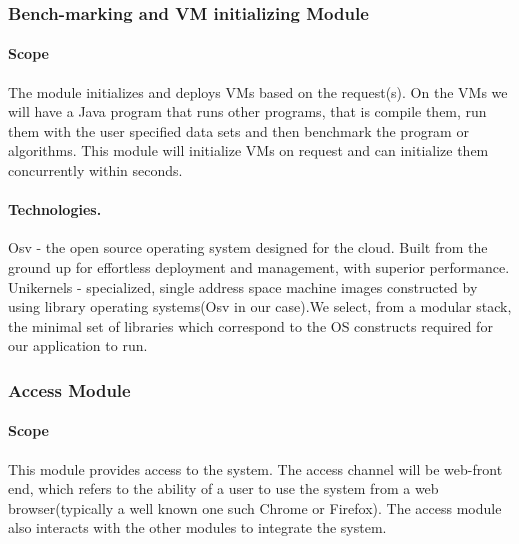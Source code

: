 \documentclass[runningheads,a4paper]{article}
\begin{document}
    \subsubsection{Bench-marking and VM initializing Module}
        \paragraph{Scope}
        
        The module initializes and deploys VMs based on the request(s). On the VMs we will have a Java program that runs other programs, that is compile them, run them with the user specified data sets and then benchmark the program or algorithms. This module will initialize VMs on request and can initialize them concurrently within seconds.\\
        
        
        \paragraph{Technologies.}
        Osv - the open source operating system designed for the cloud. Built from the ground up for effortless deployment and management, with superior performance.\\
        
        Unikernels - specialized, single address space machine images constructed by using library operating systems(Osv in our case).We select, from a modular stack, the minimal set of libraries which correspond to the OS constructs required for our application to run.\\
   
    \subsubsection{Access Module}
        \paragraph{Scope}
        This module provides access to the system. The access channel will be web-front end, which refers to the ability of a user to use the system from a web browser(typically a well known one  such Chrome or Firefox). The access module also interacts with the other modules to integrate the system. 
        
\end{document}
